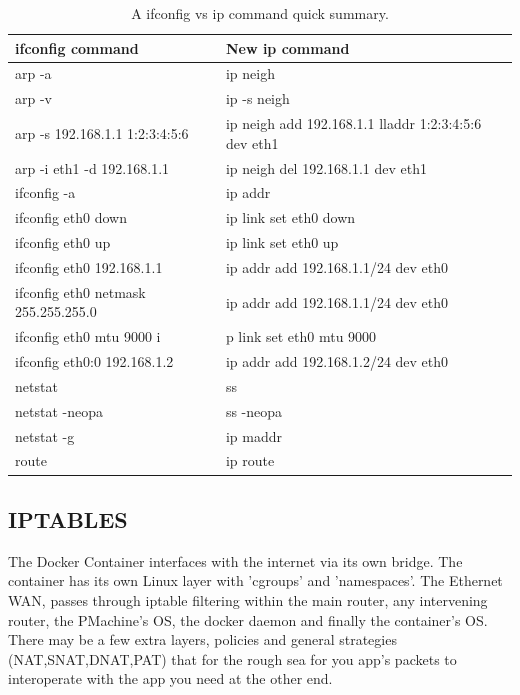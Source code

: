 \documentclass[letter,11pt,oneside]{article}
\begin{document}
\begin{table}[h!]
\centering
\begingroup \fontsize{10pt}{10pt}
\selectfont
\begin{tabular}{| l | l |}
\hline
ifconfig command & New ip command   \\
\hline
arp -a                              & ip neigh    \\ 
arp -v                              & ip -s neigh    \\ 
arp -s 192.168.1.1 1:2:3:4:5:6      & ip neigh add 192.168.1.1 lladdr 1:2:3:4:5:6 dev eth1    \\ 
arp -i eth1 -d 192.168.1.1          & ip neigh del 192.168.1.1 dev eth1    \\ 
ifconfig -a                         & ip addr    \\ 
ifconfig eth0 down                  & ip link set eth0 down    \\ 
ifconfig eth0 up                    & ip link set eth0 up    \\ 
ifconfig eth0 192.168.1.1           & ip addr add 192.168.1.1/24 dev eth0    \\ 
ifconfig eth0 netmask 255.255.255.0 & ip addr add 192.168.1.1/24 dev eth0    \\ 
ifconfig eth0 mtu 9000 i            & p link set eth0 mtu 9000    \\ 
ifconfig eth0:0 192.168.1.2         & ip addr add 192.168.1.2/24 dev eth0    \\ 
netstat                             & ss    \\ 
netstat -neopa                      & ss -neopa    \\ 
netstat -g                          & ip maddr    \\ 
route                               & ip route    \\ 
\hline
\end{tabular}
\endgroup
\caption[Net-tools vs IProute2]{A ifconfig vs ip command quick summary.}
\label{table:ifconfigvsipcommand}
\end{table}

\subsection{IPTABLES}

The Docker Container interfaces with the internet via its own
bridge. The container has its own Linux layer with 'cgroups' and
'namespaces'. The Ethernet WAN, passes through iptable filtering
within the main router, any intervening router, the PMachine's
OS, the docker daemon and finally the container's OS. There may
be a few extra layers, policies and general strategies (NAT,SNAT,DNAT,PAT)
that for the rough sea for you app's packets to interoperate with
the app you need at the other end.
\end{document}
